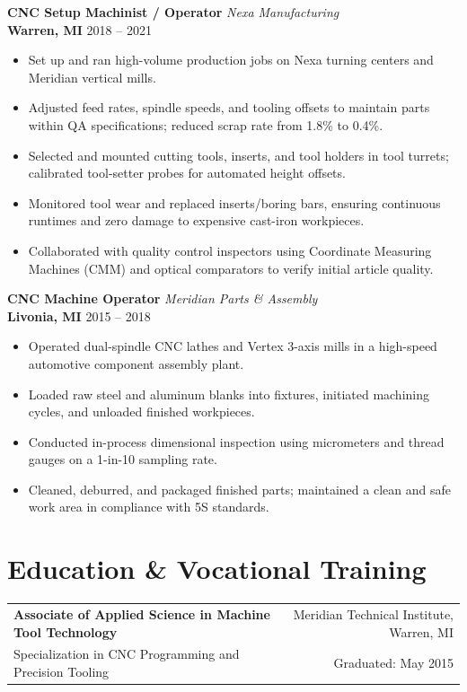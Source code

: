\documentclass[10pt,letterpaper]{article}
\newcommand{\jobheader}[4]{%
  \textbf{#1} \hfill \textit{#2} \\
  \textbf{\color{darkgray}#3} \hfill \color{darkgray}#4%
}
\begin{document}
\vspace{0.8em}

\jobheader{CNC Setup Machinist / Operator}{Nexa Manufacturing}{Warren, MI}{2018 -- 2021}
\begin{itemize}
    \item Set up and ran high-volume production jobs on Nexa turning centers and Meridian vertical mills.
    \item Adjusted feed rates, spindle speeds, and tooling offsets to maintain parts within QA specifications; reduced scrap rate from 1.8\% to 0.4\%.
    \item Selected and mounted cutting tools, inserts, and tool holders in tool turrets; calibrated tool-setter probes for automated height offsets.
    \item Monitored tool wear and replaced inserts/boring bars, ensuring continuous runtimes and zero damage to expensive cast-iron workpieces.
    \item Collaborated with quality control inspectors using Coordinate Measuring Machines (CMM) and optical comparators to verify initial article quality.
\end{itemize}

\vspace{0.8em}

\jobheader{CNC Machine Operator}{Meridian Parts \& Assembly}{Livonia, MI}{2015 -- 2018}
\begin{itemize}
    \item Operated dual-spindle CNC lathes and Vertex 3-axis mills in a high-speed automotive component assembly plant.
    \item Loaded raw steel and aluminum blanks into fixtures, initiated machining cycles, and unloaded finished workpieces.
    \item Conducted in-process dimensional inspection using micrometers and thread gauges on a 1-in-10 sampling rate.
    \item Cleaned, deburred, and packaged finished parts; maintained a clean and safe work area in compliance with 5S standards.
\end{itemize}

\section*{Education \& Vocational Training}
\begin{tabularx}{\textwidth}{X r}
    \textbf{Associate of Applied Science in Machine Tool Technology} & Meridian Technical Institute, Warren, MI \\
    Specialization in CNC Programming and Precision Tooling & Graduated: May 2015
\end{tabularx}
\end{document}
